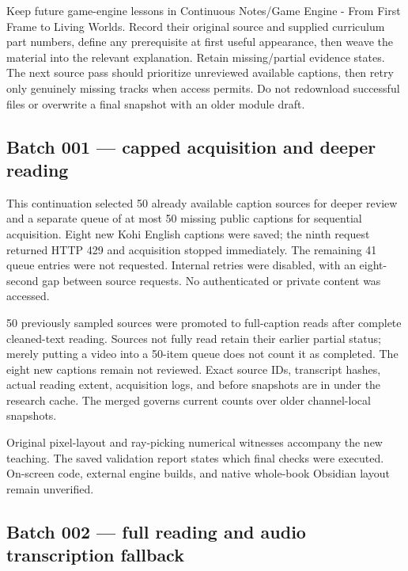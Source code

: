 \hypertarget{appendix-877738f6f4d2-continuing-this-one-volume}{}

Keep future game-engine lessons in {Continuous Notes/Game Engine - From First Frame to Living Worlds}. Record their original source and supplied curriculum part numbers, define any prerequisite at first useful appearance, then weave the material into the relevant explanation. Retain missing/partial evidence states. The next source pass should prioritize unreviewed available captions, then retry only genuinely missing tracks when access permits. Do not redownload successful files or overwrite a final snapshot with an older module draft.

\subsection{Batch 001 --- capped acquisition and deeper reading}\label{appendix-877738f6f4d2-batch-001-capped-acquisition-and-deeper-reading}

\hypertarget{appendix-877738f6f4d2-batch-001-capped-acquisition-and-deeper-reading}{}

This continuation selected 50 already available caption sources for deeper review and a separate queue of at most 50 missing public captions for sequential acquisition. Eight new Kohi English captions were saved; the ninth request returned HTTP 429 and acquisition stopped immediately. The remaining 41 queue entries were not requested. Internal retries were disabled, with an eight-second gap between source requests. No authenticated or private content was accessed.

50 previously sampled sources were promoted to full-caption reads after complete cleaned-text reading. Sources not fully read retain their earlier partial status; merely putting a video into a 50-item queue does not count it as completed. The eight new captions remain not reviewed. Exact source IDs, transcript hashes, actual reading extent, acquisition logs, and before snapshots are in  under the research cache. The merged  governs current counts over older channel-local snapshots.

Original pixel-layout and ray-picking numerical witnesses accompany the new teaching. The saved validation report states which final checks were executed. On-screen code, external engine builds, and native whole-book Obsidian layout remain unverified.

\subsection{Batch 002 --- full reading and audio transcription fallback}\label{appendix-877738f6f4d2-batch-002-full-reading-and-audio-transcription-fallback}

